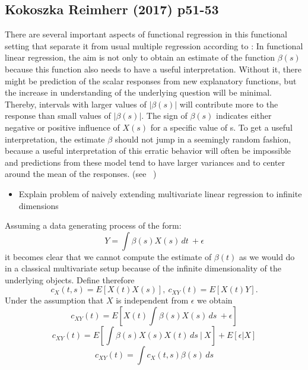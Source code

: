 \documentclass[11pt,twoside,a4paper]{article}
\begin{document}
\subsection{Kokoszka Reimherr (2017) p51-53}
There are several important aspects of functional regression in this functional setting that separate it from usual multiple regression according to \cite{kokoszka_introduction_2017}: In functional linear regression, the aim is not only to obtain an estimate of the function $\beta(s)$ because this function also needs to have a useful interpretation. Without it, there might be prediction of the scalar responses from new explanatory functions, but the increase in understanding of the underlying question will be minimal. Thereby, intervals with larger values of $|\beta(s)|$ will contribute more to the response than small values of  $|\beta(s)|$. The sign of $\beta(s)$ indicates either negative or positive influence of $X(s)$ for a specific value of s. To get a useful interpretation, the estimate $\beta$ should not jump in a seemingly random fashion, because a useful interpretation of this erratic behavior will often be impossible and predictions from these model tend to have larger variances and to center around the mean of the responses. (see ~\cite{kokoszka_introduction_2017})
	
	\begin{itemize}
		\item Explain problem of naively extending multivariate linear regression to infinite dimensions
	\end{itemize}
	Assuming a data generating process of the form:
	\begin{equation}
     Y =  \int \beta(s)X(s) \,dt \ +\epsilon
    \end{equation}
    it becomes clear that we cannot compute the estimate of $\beta(t)$ as we would do in a classical multivariate setup because of the infinite dimensionality of the underlying objects. Define therefore
    \begin{equation}
  	c_{X}(t,s) = E[X(t)X(s)],\: c_{XY}(t) = E[X(t)Y].
    \end{equation}
   Under the assumption that $X$ is independent from $\epsilon$ we obtain
   \begin{equation}
     c_{XY}(t) = E[X(t)\int \beta(s)X(s) \,ds \ +\epsilon]
   \end{equation}
    \begin{equation}
     c_{XY}(t) =  E[\int \beta(s)X(s)X(t)\,ds\:|\: X] + E[\epsilon |X]
  	\end{equation}
   	\begin{equation}
    	c_{XY}(t) = \int c_{X}(t,s) \beta(s) \,ds 
   \end{equation}
   
\end{document}
